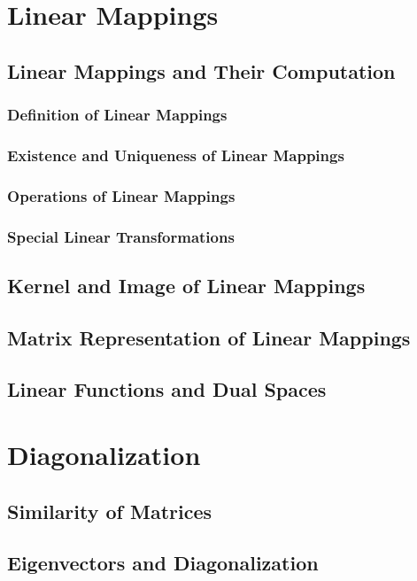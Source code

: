 \documentclass[11pt]{../../TexTemplate/elegantbook} %
\begin{document}
\chapter{Linear Mappings}
\section{Linear Mappings and Their Computation}
\subsection{Definition of Linear Mappings}

\subsection{Existence and Uniqueness of Linear Mappings}

\subsection{Operations of Linear Mappings}

\subsection{Special Linear Transformations}

\section{Kernel and Image of Linear Mappings}

\section{Matrix Representation of Linear Mappings}

\section{Linear Functions and Dual Spaces }



\chapter{Diagonalization}
\section{Similarity of Matrices}
\section{Eigenvectors and Diagonalization}
\end{document}
